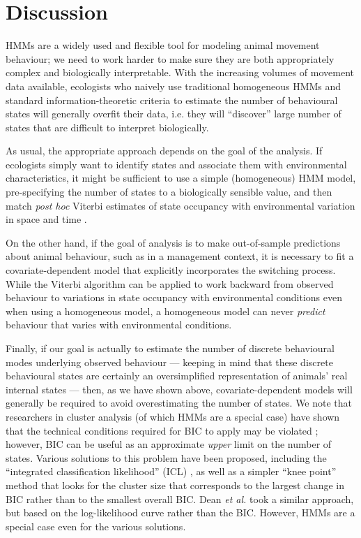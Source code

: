 \documentclass{bmcart}
\begin{document}
\section*{Discussion}

HMMs are a widely used and flexible tool for modeling animal movement
behaviour; we need to work harder to make sure they are both appropriately
complex and biologically interpretable. 
With the increasing volumes of movement data available,
ecologists who naively use traditional homogeneous HMMs
and standard information-theoretic criteria
to estimate the number of behavioural states will generally
overfit their data, i.e. they will ``discover'' large
number of states that are difficult to interpret biologically.

As usual, the appropriate approach depends on the goal of the
analysis.  If ecologists simply want to identify states
and associate them with environmental characteristics, it might be
sufficient to use a simple (homogeneous) HMM model, pre-specifying the
number of states to a biologically sensible value, and then match
\emph{post hoc} Viterbi estimates of state occupancy with
environmental variation in space and time \cite{fryxell_multiple_2008}.  

On the other hand, if the goal of analysis is to make out-of-sample
predictions about animal behaviour, such as in a management context,
it is necessary to fit a covariate-dependent model that
explicitly incorporates the switching process.
While the Viterbi algorithm can be applied to
work backward from observed behaviour
to variations in state occupancy with environmental conditions
even when using a homogeneous model,
a homogeneous model 
can never \emph{predict} behaviour that varies 
with environmental conditions.

Finally, if our goal is actually to estimate the number of discrete
behavioural modes underlying observed behaviour --- keeping in mind
that these discrete behavioural states are certainly an oversimplified
representation of animals' real internal states --- then, as we have
shown above, covariate-dependent models will generally be required to
avoid overestimating the number of states.  We note that researchers
in cluster analysis (of which HMMs are a special case) have shown that
the technical conditions required for BIC to apply may be violated
\cite{biernacki2000assessing}; however, BIC can be useful as an
approximate \emph{upper} limit on the number of states. Various
solutions to this problem have been proposed, including the
``integrated classification likelihood'' (ICL)
\cite{biernacki2000assessing,celeux2008selecting}, as well as a simpler ``knee point''
method \cite{zhao_knee_2008} that looks for the cluster size that
corresponds to the largest change in BIC rather than to the smallest
overall BIC.  Dean \emph{et al.} \cite{dean2012behavioural} took a similar approach, but
based on the log-likelihood curve rather than the BIC. However, HMMs are 
a special case even for the various solutions. 
\end{document}
